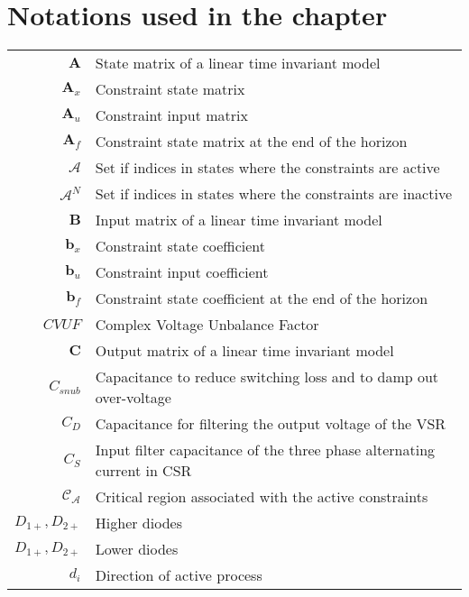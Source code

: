 \newpage
\section*{Notations used in the chapter}

\begin{scriptsize}
\begin{tabularx}{\textwidth}{r|X}
$\textbf{A}$																& State matrix of a linear time invariant model\\
$\textbf{A}_x$              & Constraint state matrix\\
$\textbf{A}_u$              & Constraint input matrix\\
$\textbf{A}_f$              & Constraint state matrix at the end of the horizon\\
$\mathcal{A}$               & Set if indices in states where the constraints are active\\
$\mathcal{A}^N$               & Set if indices in states where the constraints are inactive\\


$\textbf{B}$																& Input matrix of a linear time invariant model\\
$\textbf{b}_x$              & Constraint state coefficient\\
$\textbf{b}_u$              & Constraint input coefficient\\
$\textbf{b}_f$              & Constraint state coefficient at the end of the horizon\\

$CVUF$  													& Complex Voltage Unbalance Factor\\
$\textbf{C}$																& Output matrix of a linear time invariant model\\
$C_{snub}$ 												& Capacitance to reduce switching loss and to damp out over-voltage\\
$C_D$															& Capacitance for filtering the output voltage of the VSR\\
$C_S$															& Input filter capacitance of the three phase alternating current in CSR\\
$\mathcal{C}_{\mathcal{A}}$               & Critical region associated with the active constraints\\

$D_{1+},D_{2+}$										& Higher diodes\\
$D_{1+},D_{2+}$										& Lower diodes\\
$d_i$															& Direction of active process\\


\end{tabularx}
\end{scriptsize}

